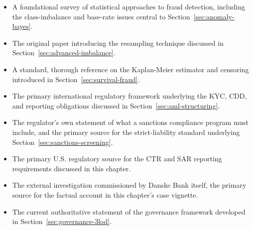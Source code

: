 \documentclass[../ai_in_finance]{subfiles}
\begin{document}
\begin{itemize}
    \item {} A foundational survey of statistical approaches to fraud detection, including the class-imbalance and base-rate issues central to Section~\ref{sec:anomaly-bayes}.
    \item {} The original paper introducing the resampling technique discussed in Section~\ref{sec:advanced-imbalance}.
    \item {} A standard, thorough reference on the Kaplan-Meier estimator and censoring introduced in Section~\ref{sec:survival-fraud}.
    \item {} The primary international regulatory framework underlying the KYC, CDD, and reporting obligations discussed in Section~\ref{sec:aml-structuring}.
    \item {} The regulator's own statement of what a sanctions compliance program must include, and the primary source for the strict-liability standard underlying Section~\ref{sec:sanctions-screening}.
    \item {} The primary U.S. regulatory source for the CTR and SAR reporting requirements discussed in this chapter.
    \item {} The external investigation commissioned by Danske Bank itself, the primary source for the factual account in this chapter's case vignette.
    \item {} The current authoritative statement of the governance framework developed in Section~\ref{sec:governance-3lod}.
\end{itemize}
\end{document}
